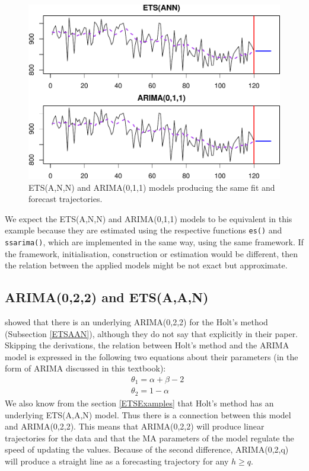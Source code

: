 \documentclass[
]{book}
\theoremstyle{definition}
\theoremstyle{definition}
\theoremstyle{definition}
\theoremstyle{definition}
\theoremstyle{remark}
\begin{document}
\begin{figure}
\centering
\includegraphics{Svetunkov--2022----ADAM_files/figure-latex/ETSARIMAConnection-1.pdf}
\caption{\label{fig:ETSARIMAConnection}ETS(A,N,N) and ARIMA(0,1,1) models producing the same fit and forecast trajectories.}
\end{figure}

We expect the ETS(A,N,N) and ARIMA(0,1,1) models to be equivalent in this example because they are estimated using the respective functions \texttt{es()} and \texttt{ssarima()}, which are implemented in the same way, using the same framework. If the framework, initialisation, construction or estimation would be different, then the relation between the applied models might be not exact but approximate.

\hypertarget{ARIMAETS022}{%
\subsection{ARIMA(0,2,2) and ETS(A,A,N)}\label{ARIMAETS022}}

\citet{Nerlove1964} showed that there is an underlying ARIMA(0,2,2) for the Holt's method (Subsection \ref{ETSAAN}), although they do not say that explicitly in their paper. Skipping the derivations, the relation between Holt's method and the ARIMA model is expressed in the following two equations about their parameters (in the form of ARIMA discussed in this textbook):
\begin{equation*}
  \begin{aligned}
    &\theta_1 = \alpha + \beta -2 \\
    &\theta_2 = 1 -\alpha
  \end{aligned}
\end{equation*}
We also know from the section \ref{ETSExamples} that Holt's method has an underlying ETS(A,A,N) model. Thus there is a connection between this model and ARIMA(0,2,2). This means that ARIMA(0,2,2) will produce linear trajectories for the data and that the MA parameters of the model regulate the speed of updating the values. Because of the second difference, ARIMA(0,2,q) will produce a straight line as a forecasting trajectory for any \(h\geq q\).
\end{document}
